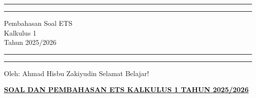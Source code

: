 \documentclass[10pt,openany,a4paper]{article}
\theoremstyle{definition}
\theoremstyle{definition}
\theoremstyle{plain}
\begin{document}
\begin{titlepage}
	\centering %
	\vspace*{1.5\baselineskip} %

	\rule{13cm}{1.6pt}\vspace*{-\baselineskip}\vspace*{2pt} %
	\rule{13cm}{0.4pt} %
	
		\vspace{0.75\baselineskip} %
	{	\Huge Pembahasan Soal ETS\\ 
			\vspace{4mm}
		Kalkulus 1 \\ \vspace{2mm} \huge{Tahun 2025/2026}\\	}
		\vspace{0.75\baselineskip} %
	\rule{13cm}{0.4pt}\vspace*{-\baselineskip}\vspace{3.2pt} %
	\rule{13cm}{1.6pt} %
	
		\vspace{1.75\baselineskip} %
{\large Oleh: Ahmad Hisbu Zakiyudin}
	\vfill
	\vspace{1mm}
\huge{Selamat Belajar!}
\end{titlepage}
\makeatletter

\setlength\fboxsep{3pt}
\setlength{\headheight}{24pt}
 \begin{center}
	{\underline{\textbf{\MakeUppercase{Soal dan Pembahasan ETS Kalkulus 1 Tahun 2025/2026}}}}
    \end{center}
\end{document}
